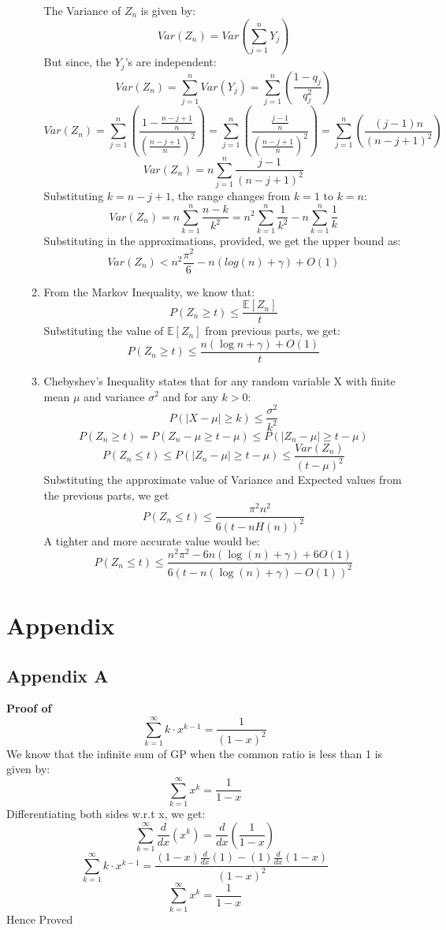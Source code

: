 \documentclass{article}
\begin{document}
\begin{enumerate}
\begin{enumerate}
    The Variance of $Z_n$ is given by:
    \[
        Var(Z_n) = Var(\sum_{j=1}^n Y_j)
    \]
    But since, the $Y_j$'s are independent:
    \[
        Var(Z_n) = \sum_{j=1}^n Var(Y_j) = \sum_{j=1}^{n}\left( \frac{1-q_j}{q_j^2} \right)
    \]
    \[
        Var(Z_n) = \sum_{j=1}^{n}\left( \frac{1- \frac{n-j+1}{n} }{(\frac{n-j+1}{n})^2} \right) = \sum_{j=1}^{n}\left( \frac{\frac{j-1}{n} }{(\frac{n-j+1}{n})^2} \right) = \sum_{j=1}^{n}\left( \frac{(j-1)n}{(n-j+1)^2} \right)
    \]
    \[
        Var(Z_n) = n \sum_{j=1}^{n} \frac{j-1}{(n-j+1)^2}
    \]
    Substituting $k = n-j+1$, the range changes from $k=1$ to $k=n$:
    \[
        Var(Z_n) = n\sum_{k=1}^{n}\frac{n-k}{k^2} = n^2\sum_{k=1}^{n}\frac{1}{k^2} - n\sum_{k=1}^{n}\frac{1}{k}
    \]
    Substituting in the approximations, provided, we get the upper bound as:
    \[
        \boxed{Var(Z_n) < n^2 \frac{\pi^2}{6} - n( log(n) +  \gamma) + O(1)}
    \]

    \item From the Markov Inequality, we know that:
    \[  
        P(Z_n\geq t) \leq \frac{\mathbb{E}[Z_n]}{t}
    \]
    Substituting the value of $\mathbb{E}[Z_n]$ from previous parts, we get:
    \[
        \boxed{P(Z_n\geq t) \leq \frac{n(\log{n} + \gamma) + O(1)}{t}}
    \]

    \item Chebyshev's Inequality states that for any random variable X with finite mean $\mu$ and variance $\sigma^2$ and for any $k > 0$:
    \[
        P(|X-\mu| \ge k) \le \frac{\sigma^2}{k^2}
    \]
    \[
        P(Z_n \ge t) = P(Z_n - \mu \ge t - \mu) \le P(|Z_n - \mu| \ge t - \mu)
    \]
    \[
        P(Z_n \le t) \le P(|Z_n - \mu| \ge t - \mu) \le \frac{Var(Z_n)}{(t-\mu)^2}
    \]
    Substituting the approximate value of Variance and Expected values from the previous parts, we get
    \[
        \boxed{ P(Z_n \le t) \le \frac{\pi^2n^2}{6(t-nH(n))^2} }
    \]
    A tighter and more accurate value would be:
    \[
        P(Z_n \le t) \le \frac{n^2\pi^2 - 6n(\log(n) + \gamma) + 6O(1)}{6(t-n(\log (n) + \gamma)-O(1))^2}
    \]

\end{enumerate}
\end{enumerate}

\newpage
\section*{Appendix}
\subsection*{Appendix A}
\textbf{Proof of} \[
    \sum_{k=1}^{\infty}k\cdot x^{k-1} = \frac{1}{(1-x)^2}
\]
We know that the infinite sum of GP when the common ratio is less than 1 is given by:
\[
    \sum_{k=1}^{\infty}x^k = \frac{1}{1-x}
\]
Differentiating both sides w.r.t x, we get:
\[
    \sum_{k=1}^{\infty}\frac{d}{dx}\left( x^k\right) = \frac{d}{dx} \left( \frac{1}{1-x}\right)
\]
\[
    \sum_{k=1}^{\infty}k\cdot x^{k-1} = \frac{(1-x) \frac{d}{dx}(1) - (1)\frac{d}{dx}(1-x)}{(1-x)^2}
\]
\[
    \sum_{k=1}^{\infty}x^k = \frac{1}{1-x}
\]
Hence Proved
\end{document}
